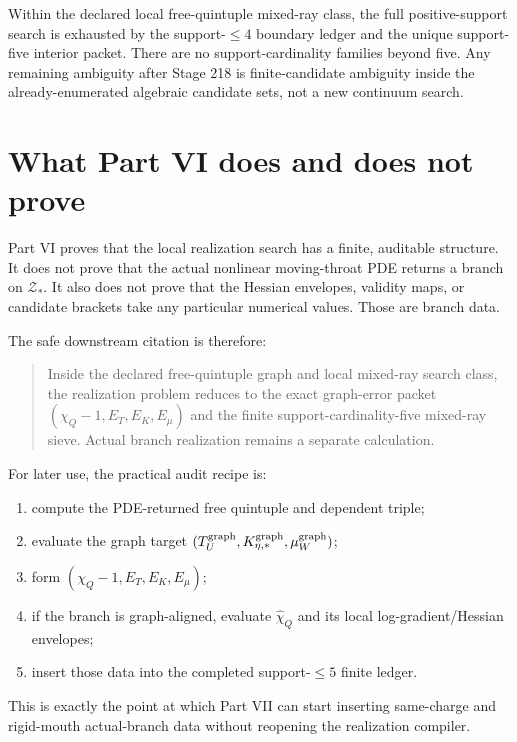 \begin{theorem}
\label{thm:app-part06-final-local-mixed-ray-closure}
Within the declared local free-quintuple mixed-ray class, the full positive-support search is exhausted by the support-\(\le4\) boundary ledger and the unique support-five interior packet.  There are no support-cardinality families beyond five.  Any remaining ambiguity after Stage 218 is finite-candidate ambiguity inside the already-enumerated algebraic candidate sets, not a new continuum search.
\end{theorem}


\section{What Part VI does and does not prove}
\label{sec:app-part06-what-it-does-not-prove}

Part VI proves that the local realization search has a finite, auditable structure.  It does not prove that the actual nonlinear moving-throat PDE returns a branch on \(\mathcal Z_*\).  It also does not prove that the Hessian envelopes, validity maps, or candidate brackets take any particular numerical values.  Those are branch data.

The safe downstream citation is therefore:
\begin{quote}
Inside the declared free-quintuple graph and local mixed-ray search class, the realization problem reduces to the exact graph-error packet \((\chi_Q-1,E_T,E_K,E_\mu)\) and the finite support-cardinality-five mixed-ray sieve.  Actual branch realization remains a separate calculation.
\end{quote}

For later use, the practical audit recipe is:
\begin{enumerate}[leftmargin=2.2em]
  \item compute the PDE-returned free quintuple and dependent triple;
  \item evaluate the graph target \((T_U^{\rm graph},K_{\eta,*}^{\rm graph},\mu_W^{\rm graph})\);
  \item form \((\chi_Q-1,E_T,E_K,E_\mu)\);
  \item if the branch is graph-aligned, evaluate \(\widehat\chi_Q\) and its local log-gradient/Hessian envelopes;
  \item insert those data into the completed support-\(\le5\) finite ledger.
\end{enumerate}
This is exactly the point at which Part VII can start inserting same-charge and rigid-mouth actual-branch data without reopening the realization compiler.



